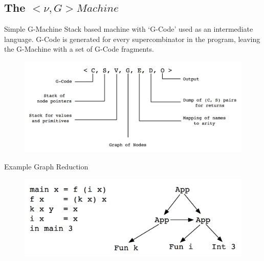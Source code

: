 \documentclass{beamer}
\begin{document}
\subsection[The $< \nu, G> Machine$]{The $< \nu, G> Machine$}

\begin{frame}{Simple G-Machine}
Stack based machine with `G-Code' used as an intermediate language. G-Code is generated for
every supercombinator in the program, leaving the G-Machine with a set of G-Code fragments.  
    \begin{figure}
    \centering
        \includegraphics[scale=.3]{figures/GMachineState.png}
    \end{figure}
\end{frame}

\begin{frame}{Example Graph Reduction}
    \begin{figure}
    \centering
        \includegraphics[scale=.3]{figures/GraphRed1.png}
    \end{figure}
\end{frame}
\end{document}
